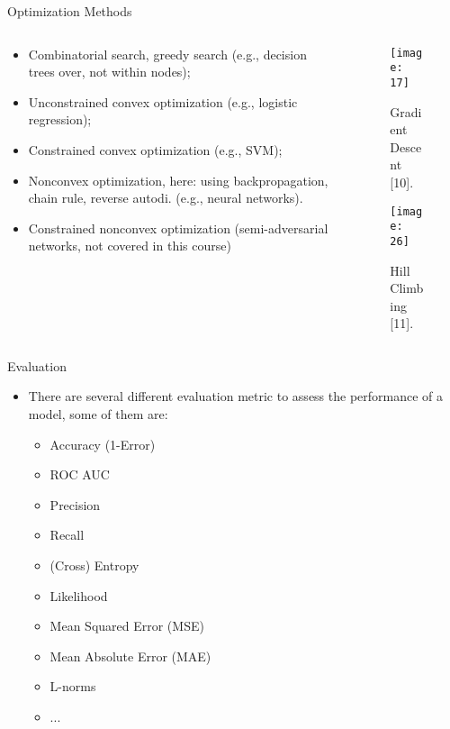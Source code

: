 \documentclass[compress,oilve]{beamer}
\begin{document}
\begin{frame}{Optimization Methods}
\begin{columns}
\begin{column}{0.5\textwidth}
\begin{itemize}
\item Combinatorial search, greedy search (e.g., decision trees over, not within nodes);
\item Unconstrained convex optimization (e.g., logistic regression);
\item Constrained convex optimization (e.g., SVM);
\item Nonconvex optimization, here: using backpropagation, chain rule, reverse autodi. (e.g., neural networks).
\item Constrained nonconvex optimization (semi-adversarial networks, not covered in this course)
\end{itemize}
\end{column}
\begin{column}{0.5\textwidth}
\begin{figure}
\centering
\texttt{[image: 17]}  
 \caption{Gradient Descent [10].}
\end{figure}
\begin{figure}
\centering
\texttt{[image: 26]}  
 \caption{Hill Climbing [11].}
\end{figure}
\end{column}
\end{columns}
\end{frame}

\begin{frame}{Evaluation}
\begin{itemize}
\item There are several different evaluation metric to assess the performance of a
model, some of them are:
	\begin{itemize}
		\item Accuracy (1-Error)
                   \item ROC AUC
                   \item Precision
                   \item Recall
                    \item (Cross) Entropy
                   \item Likelihood
                    \item Mean Squared Error (MSE)
		\item Mean Absolute Error (MAE)
                    \item L-norms
                   \item ...
	\end{itemize}
\end{itemize}
\end{frame}
\end{document}
